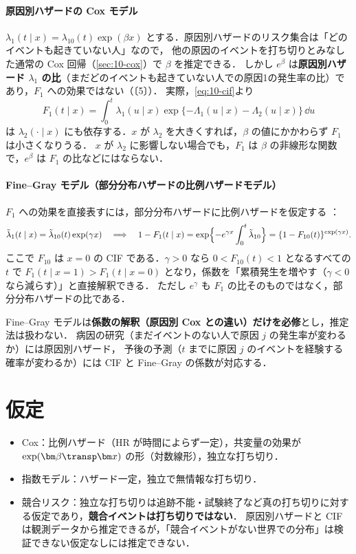 \paragraph{原因別ハザードの Cox モデル}
$\lambda_1(t\mid x)=\lambda_{10}(t)\exp(\beta x)$ とする．原因別ハザードのリスク集合は「どのイベントも起きていない人」なので，
他の原因のイベントを打ち切りとみなした通常の Cox 回帰（\cref{sec:10-cox}）で $\beta$ を推定できる．
しかし $e^\beta$ は\textbf{原因別ハザード $\lambda_1$ の比}（まだどのイベントも起きていない人での原因1の発生率の比）であり，$F_1$ への効果ではない（〔5〕）．
実際，\cref{eq:10-cif}より
\[
F_1(t\mid x)=\int_0^t\lambda_1(u\mid x)\exp\{-\Lambda_1(u\mid x)-\Lambda_2(u\mid x)\}\,\dd u
\]
は $\lambda_2(\cdot\mid x)$ にも依存する．$x$ が $\lambda_2$ を大きくすれば，$\beta$ の値にかかわらず $F_1$ は小さくなりうる．
$x$ が $\lambda_2$ に影響しない場合でも，$F_1$ は $\beta$ の非線形な関数で，$e^\beta$ は $F_1$ の比などにはならない．

\paragraph{Fine--Gray モデル（部分分布ハザードの比例ハザードモデル）}
$F_1$ への効果を直接表すには，部分分布ハザードに比例ハザードを仮定する \cite{finegray1999}：
\[
\tilde\lambda_1(t\mid x)=\tilde\lambda_{10}(t)\exp(\gamma x)
\quad\Longrightarrow\quad
1-F_1(t\mid x)=\exp\Bigl\{-e^{\gamma x}\int_0^t\tilde\lambda_{10}\Bigr\}=\{1-F_{10}(t)\}^{\exp(\gamma x)}.
\]
ここで $F_{10}$ は $x=0$ の CIF である．$\gamma>0$ なら $0<F_{10}(t)<1$ となるすべての $t$ で $F_1(t\mid x=1)>F_1(t\mid x=0)$ となり，係数を「累積発生を増やす（$\gamma<0$ なら減らす）」と直接解釈できる．
ただし $e^\gamma$ も $F_1$ の比そのものではなく，部分分布ハザードの比である．
\begin{pointbox}[本書での扱い]
Fine--Gray モデルは\textbf{係数の解釈（原因別 Cox との違い）だけを必修}とし，推定法は扱わない．
病因の研究（まだイベントのない人で原因 $j$ の発生率が変わるか）には原因別ハザード，
予後の予測（$t$ までに原因 $j$ のイベントを経験する確率が変わるか）には CIF と Fine--Gray の係数が対応する．
\end{pointbox}

\section{仮定}\label{sec:10-assump}
\begin{itemize}
\item Cox：比例ハザード（HR が時間によらず一定），共変量の効果が $\exp(\bm\beta\transp\bm x)$ の形（対数線形），独立な打ち切り．
\item 指数モデル：ハザード一定，独立で無情報な打ち切り．
\item 競合リスク：独立な打ち切りは追跡不能・試験終了など真の打ち切りに対する仮定であり，\textbf{競合イベントは打ち切りではない}．
      原因別ハザードと CIF は観測データから推定できるが，「競合イベントがない世界での分布」は検証できない仮定なしには推定できない．
\end{itemize}


